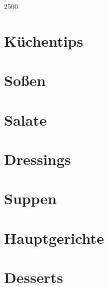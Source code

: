 \documentclass[10pt, a4paper, twoside]{book} %
\makeatletter
\newcommand\GRAANDE{\@setfontsize\Huge{250}{0}}
\makeatother
\begin{document}
\renewcommand{\indexname}{S\-t\-i\-c\-h\-w\-o\-r\-t\-v\-e\-r\-z\-e\-i\-c\-h\-n\-i\-s}

\justify
\setlength\parindent{0pt}

\thispagestyle{empty}
\vspace*{3cm}
\begin{center}
{\GRAANDE{\textsc{}}}
\vspace{2cm}
\end{center}
\vspace{3cm}
\newpage

\tableofcontents

\cleardoublepage
\printindex

\cleardoublepage
{}

\chapter{K\-ü\-c\-h\-e\-n\-t\-i\-p\-s}
\thispagestyle{empty}

\chapter{S\-o\-ß\-e\-n}
\thispagestyle{empty}




\chapter{S\-a\-l\-a\-t\-e}
\thispagestyle{empty}

\chapter{D\-r\-e\-s\-s\-i\-n\-g\-s}
\thispagestyle{empty}

\chapter{S\-u\-p\-p\-e\-n}
\thispagestyle{empty}

\chapter{H\-a\-u\-p\-t\-g\-e\-r\-i\-c\-h\-t\-e}
\thispagestyle{empty}

\chapter{D\-e\-s\-s\-e\-r\-t\-s}
\thispagestyle{empty}

\end{document}
